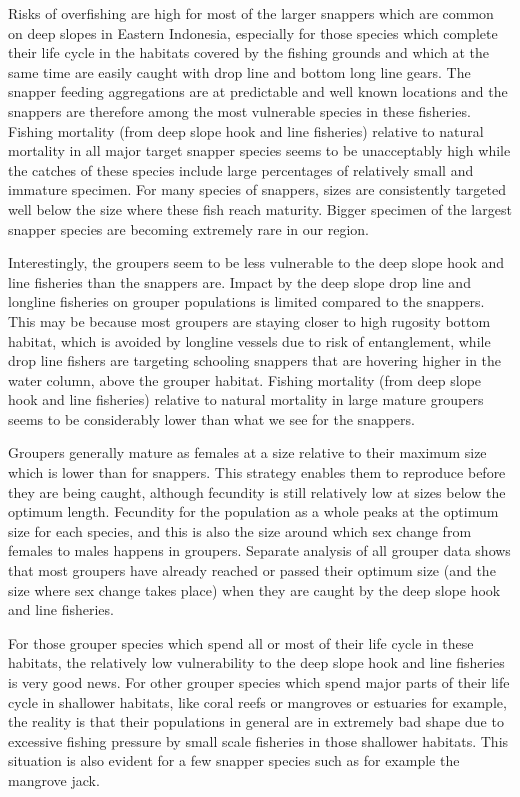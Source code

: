 Risks of overfishing are high for most of the larger snappers which are common on deep slopes in Eastern Indonesia, especially for those species which complete their life cycle in the habitats covered by the fishing grounds and which at the same time are easily caught with drop line and bottom long line gears. The snapper feeding aggregations are at predictable and well known locations and the snappers are therefore among the most vulnerable species in these fisheries. Fishing mortality (from deep slope hook and line fisheries) relative to natural mortality in all major target snapper species seems to be unacceptably high while the catches of these species include large percentages of relatively small and immature specimen. For many species of snappers, sizes are consistently targeted well below the size where these fish reach maturity. Bigger specimen of the largest snapper species are becoming extremely rare in our region.

Interestingly, the groupers seem to be less vulnerable to the deep slope hook and line fisheries than the snappers are. Impact by the deep slope drop line and longline fisheries on grouper populations is limited compared to the snappers. This may be because most groupers are staying closer to high rugosity bottom habitat, which is avoided by longline vessels due to risk of entanglement, while drop line fishers are targeting schooling snappers that are hovering higher in the water column, above the grouper habitat. Fishing mortality (from deep slope hook and line fisheries) relative to natural mortality in large mature groupers seems to be considerably lower than what we see for the snappers.

Groupers generally mature as females at a size relative to their maximum size which is lower than for snappers. This strategy enables them to reproduce before they are being caught, although fecundity is still relatively low at sizes below the optimum length. Fecundity for the population as a whole peaks at the optimum size for each species, and this is also the size around which sex change from females to males happens in groupers. Separate analysis of all grouper data shows that most groupers have already reached or passed their optimum size (and the size where sex change takes place) when they are caught by the deep slope hook and line fisheries.

For those grouper species which spend all or most of their life cycle in these habitats, the relatively low vulnerability to the deep slope hook and line fisheries is very good news. For other grouper species which spend major parts of their life cycle in shallower habitats, like coral reefs or mangroves or estuaries for example, the reality is that their populations in general are in extremely bad shape due to excessive fishing pressure by small scale fisheries in those shallower habitats. This situation is also evident for a few snapper species such as for example the mangrove jack.

